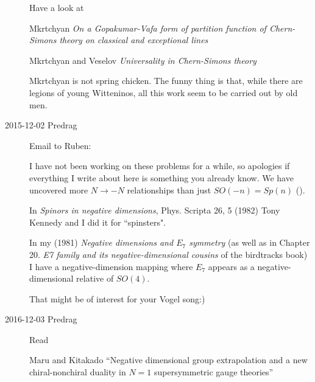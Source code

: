 \begin{description}
Have a look at

Mkrtchyan {\em On a {Gopakumar-Vafa} form of
partition function of {Chern-Simons} theory on classical and exceptional
lines}

Mkrtchyan and Veselov
{\em Universality in {Chern-Simons} theory}

Mkrtchyan is not spring chicken. The funny thing is that, while there are
legions of young Witteninos, all this work seem to be carried out by old
men.



\item[2015-12-02  Predrag]
Email to Ruben:

I have not been working on these problems for a while, so apologies if
everything I write about here is something you already know. We have
uncovered more $N \to -N$ relationships than just $SO(-n)=Sp(n)$
().

In {\em Spinors in negative dimensions},
Phys. Scripta 26, 5 (1982) Tony Kennedy and I did it for ``spinsters".

In my (1981) {\em Negative dimensions and $E_7$ symmetry}
 (as well as in Chapter 20. {\em E7 family and its
negative-dimensional cousins} of the birdtracks book) I have a
negative-dimension mapping where $E_7$  appears as a
negative-dimensional relative of $SO(4)$.

That might be of interest for your Vogel song:)

\item[2016-12-03 Predrag]
Read

Maru and Kitakado
``Negative dimensional group extrapolation and a new chiral-nonchiral
duality in $N = 1$ supersymmetric gauge theories''


\end{description}


\printbibliography[heading=subbibintoc,title={References}]
